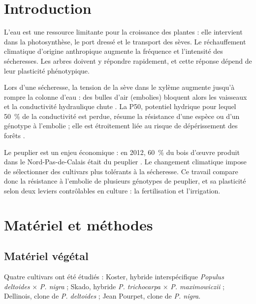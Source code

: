 \documentclass[11pt,a4paper]{article}
\begin{document}
\pagedegarde


\section{Introduction}
L'eau est une ressource limitante pour la croissance des plantes : elle intervient dans la photosynthèse, le port dressé et le transport des sèves. Le réchauffement climatique d'origine anthropique augmente la fréquence et l'intensité des sécheresses. Les arbres doivent y répondre rapidement, et cette réponse dépend de leur plasticité phénotypique.

Lors d'une sécheresse, la tension de la sève dans le xylème augmente jusqu'à rompre la colonne d'eau : des bulles d'air (embolies) bloquent alors les vaisseaux et la conductivité hydraulique chute \parencite{tyree1989}. La P50, potentiel hydrique pour lequel 50~\% de la conductivité est perdue, résume la résistance d'une espèce ou d'un génotype à l'embolie ; elle est étroitement liée au risque de dépérissement des forêts \parencite{choat2012}.

Le peuplier est un enjeu économique : en 2012, 60~\% du bois d'œuvre produit dans le Nord-Pas-de-Calais était du peuplier \parencite{zapater}. Le changement climatique impose de sélectionner des cultivars plus tolérants à la sécheresse. Ce travail compare donc la résistance à l'embolie de plusieurs génotypes de peuplier, et sa plasticité selon deux leviers contrôlables en culture : la fertilisation et l'irrigation.

\section{Matériel et méthodes}
\subsection{Matériel végétal}
Quatre cultivars ont été étudiés : Koster, hybride interspécifique \emph{Populus deltoides} × \emph{P. nigra} ; Skado, hybride \emph{P. trichocarpa} × \emph{P. maximowiczii} ; Dellinois, clone de \emph{P. deltoides} ; Jean Pourpet, clone de \emph{P. nigra}.
\end{document}

